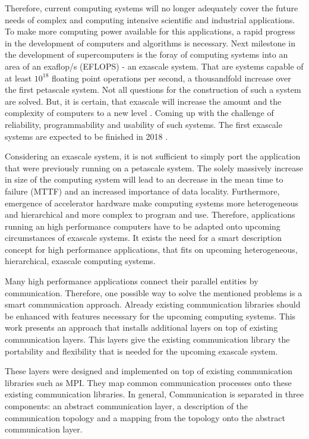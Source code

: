 Therefore, current computing systems will no longer adequately cover the
future needs of complex and computing intensive scientific and
industrial applications.  To make more computing power available for
this applications, a rapid progress in the development of computers
and algorithms is necessary.  Next milestone in the development of
supercomputers is the foray of computing systems into an area of an
exaflop/s (EFLOPS) - an exascale system. That are systems capable of
at least $10^{18}$ floating point operations per second, a
thousandfold increase over the first petascale system.  Not all
questions for the construction of such a system are solved. But, it is
certain, that exascale will increase the amount and the complexity of
computers to a new level \cite{ref:cresta}. Coming up with the
challenge of reliability, programmability and usability of such
systems. The first exascale systems are expected to be finished in
2018 \cite{ref:cresta}.

Considering an exascale system, it is not sufficient to simply port
the application that were previously running on a petascale
system. The solely massively increase in size of the computing system
will lead to an decrease in the mean time to failure (MTTF) and an
increased importance of data locality.  Furthermore, emergence of
accelerator hardware make computing systems more heterogeneous and
hierarchical and more complex to program and use. Therefore,
applications running an high performance computers have to be adapted
onto upcoming circumstances of exascale systems. It exists the need
for a smart description concept for high performance applications,
that fits on upcoming heterogeneous, hierarchical, exascale computing
systems.

Many high performance applications connect their parallel entities by
communication.  Therefore, one possible way to solve the mentioned
problems is a smart communication approach. Already existing
communication libraries should be enhanced with features necessary for
the upcoming computing systems.  This work presents an approach that
installs additional layers on top of existing communication
layers. This layers give the existing communication library the
portability and flexibility that is needed for the upcoming exascale
system.

These layers were designed and implemented on top of existing
communication libraries such as MPI. They map common communication
processes onto these existing communication libraries. In general,
Communication is separated in three components: an abstract
communication layer, a description of the communication topology and a
mapping from the topology onto the abstract communication layer.

